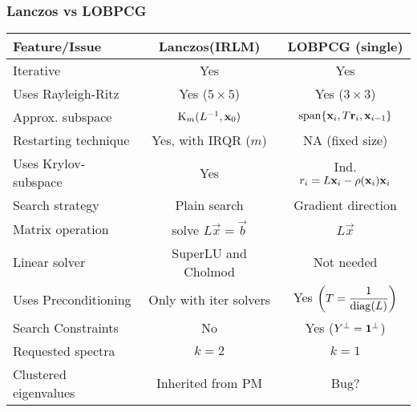 \begin{frame}
  \frametitle{Lanczos vs LOBPCG}
  \begin{table}
    \begin{tabular}{l | c | c | }
      Feature/Issue & Lanczos(IRLM) & LOBPCG (single) \\
      \hline \hline
      Iterative &
      Yes  &
      Yes  \\
      \hline
      Uses Rayleigh-Ritz &
      Yes ($5 \times 5$) &
      Yes ($3 \times 3$) \\
      \hline      
      Approx. subspace &
       $\Krylov{\inv{L}}{\vec{x}_0}{m}$ &
      $\func{span} \{\vec{x}_i, T\vec{r}_i, \vec{x}_{i-1}\}$ \\      
      \hline
      Restarting technique &
      Yes, with IRQR ($m$) &
      NA (fixed size) \\
      \hline
      Uses Krylov-subspace &
      Yes &
      Ind. $r_i = L\vec{x}_i - \func{\rho}(\vec{x}_i)\vec{x}_i$\\
      \hline
      Search strategy &
      Plain search &
      Gradient direction \\
      \hline
      Matrix operation &
      solve $L\vec{x} = \vec{b}$ &
      $L\vec{x}$ \\
      \hline
      Linear solver &
      SuperLU and Cholmod &
      Not needed \\
      \hline
      Uses Preconditioning &
      Only with iter solvers &
      Yes $\left(T = \dfrac{1}{\func{diag}(L)} \right)$ \\
      \hline
      Search Constraints &
      No &
      Yes ($\ortc{Y} = \ortc{\vec{1}}$) \\
      \hline
      Requested spectra &
      $k=2$ &
      $k=1$ \\      
      \hline
      Clustered eigenvalues &
      Inherited from PM &
      Bug? \\      
      \hline
    \end{tabular}
  \end{table}
\end{frame}

